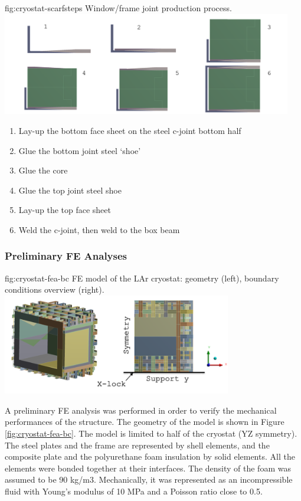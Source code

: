 \begin{dunefigure}{fig:cryostat-scarfsteps}
{Window/frame joint production process.}
\includegraphics[width=0.95\textwidth]{graphics/cryostat/cryostat-scarfsteps.png}
\end{dunefigure}

\begin{enumerate}
\item Lay-up the bottom face sheet on the steel c-joint bottom half
\item Glue the bottom joint steel ‘shoe’
\item Glue the core
\item Glue the top joint steel shoe
\item Lay-up the top face sheet
\item Weld the c-joint, then weld to the box beam
\end{enumerate}

\subsubsection{Preliminary FE Analyses}
\label{sec:cryost-des-warm-FEA}

\begin{dunefigure}{fig:cryostat-fea-bc}
{FE model of the LAr cryostat: geometry (left), boundary conditions overview (right).}
\includegraphics[width=0.75\textwidth]{graphics/cryostat/cryostat-fea-bc.png}
\end{dunefigure}

A preliminary FE analysis was performed in order to verify the mechanical performances of the structure. The geometry of the model is shown in Figure \ref{fig:cryostat-fea-bc}. The model is limited to half of the cryostat (YZ symmetry). The steel plates and the frame are represented by shell elements, and the composite plate and the polyurethane foam insulation by solid elements. All the elements were bonded together at their interfaces. The density of the foam was assumed to be 90 kg/m3. Mechanically, it was represented as an incompressible fluid with Young’s modulus of 10 MPa and a Poisson ratio close to 0.5.

